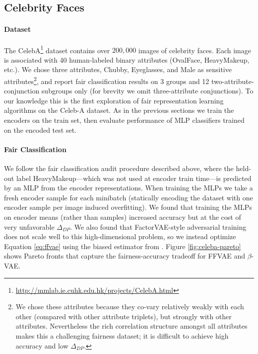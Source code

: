 \subsection{Celebrity Faces} \label{sec:celeba}



\paragraph{Dataset}
The CelebA\footnote{\scriptsize \url{http://mmlab.ie.cuhk.edu.hk/projects/CelebA.html}} dataset contains over $200,000$ images of celebrity faces.
Each image is associated with 40 human-labeled binary attributes (OvalFace, HeavyMakeup, etc.).
We chose three attributes, Chubby, Eyeglasses, and Male as sensitive attributes\footnote{
We chose these attributes because they co-vary relatively weakly with each other (compared with other attribute triplets), but strongly with other attributes.
Nevertheless the rich correlation structure amongst all attributes makes this a challenging fairness dataset; it is difficult to achieve high accuracy and low $\Delta_{DP}$.
}, and report fair classification results on 3 groups and 12 two-attribute-conjunction subgroups only (for brevity we omit three-attribute conjunctions).
To our knowledge this is the first exploration of fair representation learning algorithms on the Celeb-A dataset.
As in the previous sections we train the encoders on the train set, then evaluate performance of MLP classifiers trained on the encoded test set.

\paragraph{Fair Classification}

We follow the fair classification audit procedure described above, where the held-out label HeavyMakeup---which was not used at encoder train time---is predicted by an MLP from the encoder representations.
When training the MLPs we take a fresh encoder sample for each minibatch (statically encoding the dataset with one encoder sample per image induced overfitting).
We found that training the MLPs on encoder means (rather than samples) increased accuracy but at the cost of very unfavorable $\Delta_{DP}$.
We also found that FactorVAE-style adversarial training does not scale well to this high-dimensional problem, so we instead optimize Equation \ref{eq:ffvae} using the biased estimator from \citet{chen2018isolating}.
Figure \ref{fig:celeba-pareto} shows Pareto fronts that capture the fairness-accuracy tradeoff for FFVAE and $\beta$-VAE.

